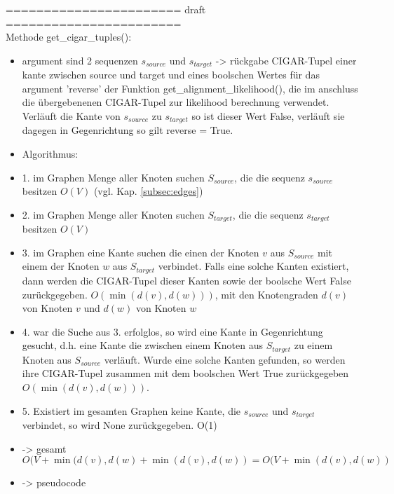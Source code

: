 \noindent======================= draft =======================\\

Methode get\_cigar\_tuples():\\
\begin{itemize}
	\item argument sind 2 sequenzen $ s_{source} $ und $ s_{target} $ -> rückgabe CIGAR-Tupel einer kante zwischen source und target und eines boolschen Wertes für das argument 'reverse' der Funktion get\_alignment\_likelihood(), die im anschluss die übergebenenen CIGAR-Tupel zur likelihood berechnung verwendet. Verläuft die Kante von $ s_{source} $ zu $ s_{target} $ so ist dieser Wert False, verläuft sie dagegen in Gegenrichtung so gilt reverse = True. \\
    \item Algorithmus:
	\item 1. im Graphen Menge aller Knoten suchen $ S_{source} $, die die sequenz $ s_{source} $ besitzen $O(V)$ (vgl. Kap. \ref{subsec:edges}) \\
	\item 2. im Graphen Menge aller Knoten suchen $ S_{target} $, die die sequenz $ s_{target} $ besitzen $ O(V) $\\
	\item 3. im Graphen eine Kante suchen die einen der Knoten $v$ aus $ S_{source} $ mit einem der Knoten $w$ aus $ S_{target} $ verbindet. Falls eine solche Kanten existiert, dann werden die CIGAR-Tupel dieser Kanten sowie der boolsche Wert False zurückgegeben. $O(\min (d(v), d(w)))$, mit den Knotengraden $d(v) $von Knoten $v$ und $d(w) $ von Knoten $w$ ~\cite{docs_graph_tool}\\
	\item 4. war die Suche aus 3. erfolglos, so wird eine Kante in Gegenrichtung gesucht, d.h. eine Kante die zwischen einem Knoten aus $ S_{target} $ zu einem Knoten aus $ S_{source} $ verläuft. Wurde eine solche Kanten gefunden, so werden ihre CIGAR-Tupel zusammen mit dem boolschen Wert True zurückgegeben $O(\min (d(v), d(w)))$.\\
	\item 5. Existiert im gesamten Graphen keine Kante, die  $ s_{source} $ und $ s_{target} $ verbindet, so wird None zurückgegeben. O(1)\\
	\item -> gesamt $ O(V+\min (d(v), d(w)+\min (d(v), d(w)) = O(V+\min (d(v), d(w))$	\\
	\item -> pseudocode\\
\end{itemize}

